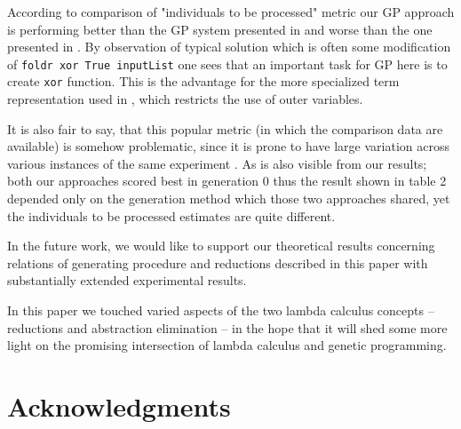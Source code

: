 \documentclass{sig-alternate}
\newcommand{\red}[1]{{\color{red} #1}}
\begin{document}
According to comparison of "individuals to be processed" metric our GP approach is performing better than the GP system presented in \cite{kes} and worse than the one presented in \cite{yu01}. By observation of typical solution which is often some modification of \texttt{foldr xor True inputList} one sees that an important task for GP here is to create \texttt{xor} function. This is the advantage for the more specialized term representation used in \cite{yu01}, which restricts the use of outer variables. 

It is also fair to say, that this popular metric (in which the comparison data are available) is somehow problematic, since it is prone to have large variation across various instances of the same experiment \cite{luke2002perfect}. As is also visible from our results; both our approaches scored best in generation 0 thus the result shown in table 2 depended only on the generation method which those two approaches shared, yet the individuals to be processed estimates are quite different.



In the future work, we would like to support our theoretical results concerning relations of generating procedure and reductions described in this paper with substantially extended experimental results.

In this paper we touched varied aspects of the two lambda calculus concepts -- reductions and abstraction elimination -- in the hope that it will shed some more light on the promising intersection of lambda calculus and genetic programming.






\section{Acknowledgments}
\end{document}
